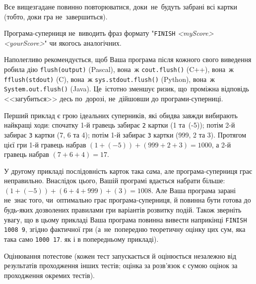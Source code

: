 Все вищезгадане повинно повторюватися, доки~не~будуть забрані всі картки (тобто, доки гра не~завершиться).

Програма-суперниця не~виводить фраз формату "\texttt{FINISH} {\it <myScore> <yourScore>}" чи якогось аналогічних.

Наполегливо рекомендується, щоб Ваша програма після кожного свого виведення 
робила дію \verb"flush(output)" (Pascal), 
вона~ж \verb"cout.flush()" (C++), 
вона~ж \verb"fflush(stdout)" (C), 
вона~ж \verb"sys.stdout.flush()" (Python),
вона~ж \verb"System.out.flush()" (Java).
Це~істотно зменшує ризик, 
що~проміжна відповідь <<загубиться>> десь по~дорозі, 
не~дійшовши до програми-суперниці.




\Example

\begin{example}
%
%
\end{example}


\Note

Перший приклад є грою ідеальних суперників, які обидва завжди вибирають найкращі ходи:
спочатку 1-й гравець забирає \texttt{2} картки (1 та~(-5)); 
потім 2-й забирає \texttt{3} картки (7, 6 та 4); 
потім 1-й забирає \texttt{3} картки (999, 2 та 3).
Протягом цієї гри 1-й гравець набрав $(1+(-5))+(999+2+3)=1000$, а 2-й гравець набрав $(7+6+4)=17$.

У др{\it у}гому прикладі послідовність карток така с{\it а}ма, але програма-суперниця грає неправильно. Внаслідок цього, Вашій програмі вдається набрати більше: $(1+(-5))+(6+4+999)+(3)=1008$. Але Ваша програма зарані не~знає того, чи~оптимально грає програма-суперниця, й повинна бути готова до будь-яких дозволених правилами гри варіантів розвитку подій. Також зверніть увагу, що в цьому прикладі Ваша програма повинна вивести наприкінці \texttt{FINISH 1008 9}, згідно фактичної гри (а~не~попередню теоретичну оцінку цих сум, яка така само \texttt{1000 17}. як і в попередньому прикладі).


\Scoring

Оцінювання потестове (кожен тест запускається й оцінюється незалежно від результатів проходження інших тестів; оцінка за розв'язок є сумою оцінок за проходження окремих тестів).

